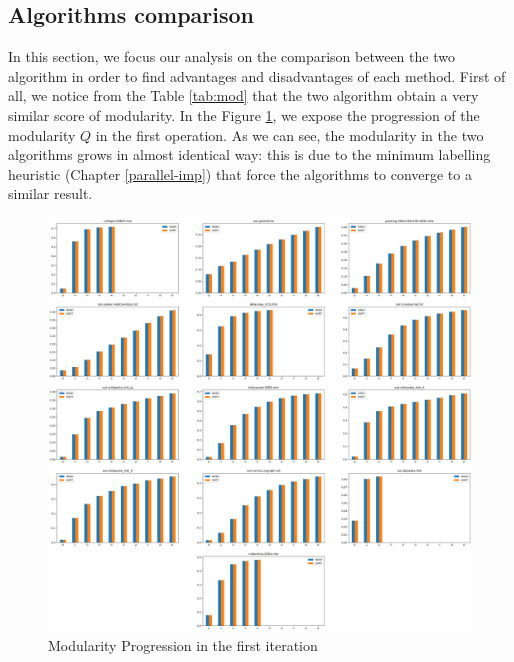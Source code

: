 \subsection{Algorithms comparison}
In this section, we focus our analysis on the comparison between the two algorithm in order to find advantages and disadvantages of each method. 
First of all, we notice from the Table \ref{tab:mod} that the two algorithm obtain a very similar score of modularity. In the Figure \ref{fig:modularity-progression}, we expose the progression of the modularity $Q$ in the first operation. As we can see, the modularity in the two algorithms grows in almost identical way: this is due to the minimum labelling heuristic (Chapter \ref{parallel-imp}) that force the algorithms to converge to a similar result. 
\begin{figure}[h]
	\centering
	\includegraphics[width=1\linewidth]{0-resources/modularity-progression}
	\caption{Modularity Progression in the first iteration}
	\label{fig:modularity-progression}
\end{figure} 


